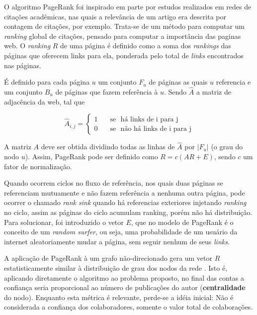 \documentclass[12pt]{article}
\begin{document}
O algoritmo PageRank \cite{page1999pagerank} foi inspirado em parte por estudos realizados em redes de citações acadêmicas, nas 
quais a relevância de um artigo era descrita por contagem de citações, por exemplo. Trata-se de um método para computar um \textit{ran\-king} 
global de citações, pensado para computar a importância das paginas web. O \textit{ranking} $R$ de uma página é definido como a soma dos 
\textit{rankings} das páginas que oferecem links para ela, ponderada pelo total de \textit{links} encontrados nas páginas.

É definido para cada página $u$ um conjunto $F_u$ de páginas as quais $u$ referencia e um conjunto $B_u$ de páginas que fazem 
referência à $u$. Sendo $\hat{A}$ a matriz de adjacência da web, tal que 

\begin{equation} \label{eqn:adjacency-matrix}
   \hat{A}_{i,j} =
    \begin{cases}
      1       & \quad \text{se } \text{ há links de i para j}\\
      0       & \quad \text{se } \text{ não há links de i para j}
    \end{cases}
\end{equation}

A matriz $A$ deve ser obtida dividindo todas as linhas de $\hat{A}$ por $|F_u|$ (o grau do nodo $u$). Assim, PageRank pode ser definido 
como $R = c(AR + E)$, sendo $c$ um fator de normalização.

Quando ocorrem ciclos no fluxo de referência, nos quais duas páginas se referenciam mutuamente e não fazem referência a nenhuma 
outra página, pode ocorrer o chamado \textit{rank sink} quando há referencias exteriores injetando \textit{ranking} no ciclo, 
assim as páginas do ciclo acumulam ranking, porém não há distribuição. Para solucionar, foi introduzido o vetor $E$, que no modelo 
de PageRank é o conceito de um \textit{random surfer}, ou seja, uma probabilidade de um usuário da internet aleatoriamente mudar a 
página, sem seguir nenhum de seus \textit{links}. \cite{page1999pagerank}

A aplicação de PageRank à um grafo não-direcionado gera um vetor $R$ estatisticamente similar à distribuição de grau dos nodos da 
rede \cite{perra2008spectral}. Isto é, aplicando diretamente o algoritmo ao problema proposto, no final das contas a confiança 
seria proporcional ao número de publicações do autor (\textbf{centralidade} do nodo). Enquanto esta métrica é relevante, perde-se 
a idéia inicial: Não é considerada a confiança dos colaboradores, somente o valor total de colaborações. 
\end{document}
